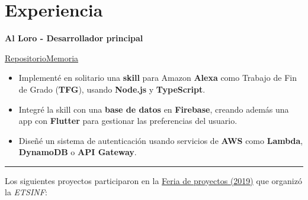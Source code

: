 \documentclass[letterpaper, 12pt]{article}
\begin{document}
    \pagebreak

    \section{Experiencia}

    \begin{center}    
    \textbf{Al Loro - Desarrollador principal}\par
    \vspace{.2em}
    \href{https://github.com/algono/FeedTheParrot-RSS}{Repositorio}\hspace{1em}\href{http://hdl.handle.net/10251/174256}{Memoria}
    \end{center}
    \begin{itemize}
        \item Implementé en solitario una \textbf{skill} para Amazon \textbf{Alexa} como Trabajo de Fin de Grado (\textbf{TFG}), usando \textbf{Node.js} y \textbf{TypeScript}.
        \item Integré la skill con una \textbf{base de datos} en \textbf{Firebase}, creando además una app con \textbf{Flutter} para gestionar las preferencias del usuario.
        \item Diseñé un sistema de autenticación usando servicios de \textbf{AWS} como \textbf{Lambda}, \textbf{DynamoDB} o \textbf{API Gateway}.
    \end{itemize}
    \rule{\textwidth}{.4pt}
    
    \vspace{5pt}
    Los siguientes proyectos participaron en la \href{https://es-es.facebook.com/etsinf/videos/feria-de-proyectos-de-estudiantes-2019/1921312964681641/}{Feria de proyectos (2019)} que organizó la \emph{ETSINF}:

    \vspace{2em}
\end{document}
